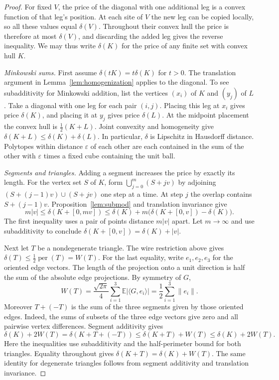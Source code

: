 \begin{proof}
For fixed $V$, the price of the diagonal with one additional leg is a
convex function of that leg's position. At each site of $V$ the new
leg can be copied locally, so all these values equal $\delta(V)$.
Throughout their convex hull the price is therefore at most $\delta(V)$,
and discarding the added leg gives the reverse inequality. We may thus
write $\delta(K)$ for the price of any finite set with convex hull $K$.

\emph{Minkowski sums.}
First assume $\delta(tK)=t\delta(K)$ for $t>0$. The translation argument
in Lemma~\ref{lem:homogenization} applies to the diagonal. To see
subadditivity for Minkowski addition, list the vertices $(x_i)$ of $K$
and $(y_j)$ of $L$. Take a diagonal with one leg for each pair $(i,j)$.
Placing this leg at $x_i$ gives price $\delta(K)$, and placing it at
$y_j$ gives price $\delta(L)$. At the midpoint placement the convex
hull is $\tfrac12(K+L)$. Joint convexity and homogeneity give
$\delta(K+L)\leq\delta(K)+\delta(L)$. In particular, $\delta$ is
Lipschitz in Hausdorff distance. Polytopes within distance
$\varepsilon$ of each other are each contained in the sum of the other
with $\varepsilon$ times a fixed cube containing the unit ball.

\emph{Segments and triangles.}
Adding a segment increases the price by exactly its length. For the
vertex set $S$ of $K$, form $\bigcup_{j=0}^m(S+jv)$ by adjoining
$(S+(j-1)v)\cup(S+jv)$ one step at a time. At step $j$ the overlap
contains $S+(j-1)v$. Proposition~\ref{lem:submod} and translation invariance
give
\[
 m|v|\leq\delta(K+[0,mv])
 \leq \delta(K)+m\big(\delta(K+[0,v])-\delta(K)\big).
\]
The first inequality uses a pair of points distance $m|v|$ apart.
Let $m\to\infty$ and use subadditivity to conclude
$\delta(K+[0,v])=\delta(K)+|v|$.

Next let $T$ be a nondegenerate triangle. The wire restriction above
gives $\delta(T)\le\tfrac12\operatorname{per}(T)=W(T)$.
For the last equality, write $e_1,e_2,e_3$ for the oriented edge
vectors. The length of the projection onto a unit direction is half
the sum of the absolute edge projections. By symmetry of $G$,
\[
 W(T)=\frac{\sqrt{2\pi}}{4}\sum_{i=1}^3\mathbb E|\langle G,e_i\rangle|
      =\frac12\sum_{i=1}^3\|e_i\|.
\]
Moreover $T+(-T)$ is the sum of
the three segments given by those oriented edges. Indeed, the sums of
subsets of the three edge vectors give zero and all pairwise vertex
differences. Segment additivity gives
\[
\delta(K)+2W(T)=\delta(K+T+(-T))
       \le \delta(K+T)+W(T)\le \delta(K)+2W(T).
\]
Here the inequalities use subadditivity and the half-perimeter bound
for both triangles. Equality throughout gives
$\delta(K+T)=\delta(K)+W(T)$. The same identity for degenerate
triangles follows from segment additivity and translation invariance.


\end{proof}
